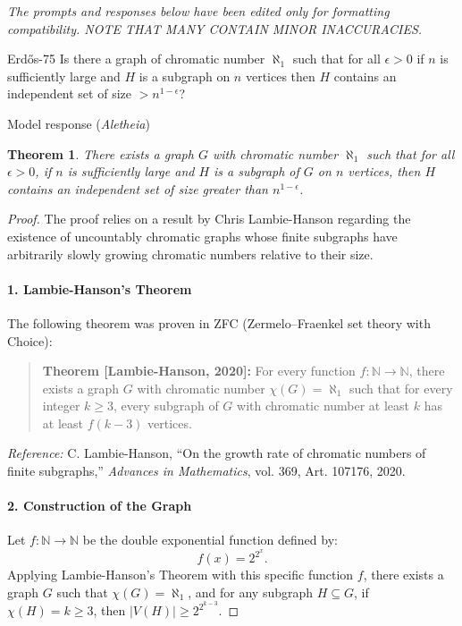 \documentclass[11pt]{article}
\newtheorem{theorem}{Theorem}
\begin{document}
\emph{The prompts and responses below have been edited only for
formatting compatibility. NOTE THAT MANY CONTAIN MINOR INACCURACIES.}

\begin{problem}{Erd\H{o}s-75}
Is there a graph of chromatic number $\aleph_1$ such that for all $\epsilon>0$ if $n$ is sufficiently large and $H$ is a subgraph on $n$ vertices then $H$ contains an independent set of size $>n^{1-\epsilon}$?
\end{problem}

\begin{solution}{Model response (\emph{Aletheia})}
\begin{theorem}
There exists a graph $G$ with chromatic number $\aleph_1$ such that for all $\epsilon > 0$, if $n$ is sufficiently large and $H$ is a subgraph of $G$ on $n$ vertices, then $H$ contains an independent set of size greater than $n^{1-\epsilon}$.
\end{theorem}

\begin{proof}
The proof relies on a result by Chris Lambie-Hanson regarding the existence of uncountably chromatic graphs whose finite subgraphs have arbitrarily slowly growing chromatic numbers relative to their size.

\paragraph{1. Lambie-Hanson's Theorem}
The following theorem was proven in ZFC (Zermelo–Fraenkel set theory with Choice):

\begin{quote}
\textbf{Theorem [Lambie-Hanson, 2020]:} For every function $f: \mathbb{N} \to \mathbb{N}$, there exists a graph $G$ with chromatic number $\chi(G) = \aleph_1$ such that for every integer $k \ge 3$, every subgraph of $G$ with chromatic number at least $k$ has at least $f(k-3)$ vertices.
\end{quote}

\textit{Reference:} C. Lambie-Hanson, ``On the growth rate of chromatic numbers of finite subgraphs,'' \textit{Advances in Mathematics}, vol. 369, Art. 107176, 2020.

\paragraph{2. Construction of the Graph}
Let $f: \mathbb{N} \to \mathbb{N}$ be the double exponential function defined by:
\[ f(x) = 2^{2^x}. \]
Applying Lambie-Hanson's Theorem with this specific function $f$, there exists a graph $G$ such that $\chi(G) = \aleph_1$, and for any subgraph $H \subseteq G$, if $\chi(H) = k \ge 3$, then $|V(H)| \ge 2^{2^{k-3}}$.


\end{proof}
\end{solution}
\end{document}
